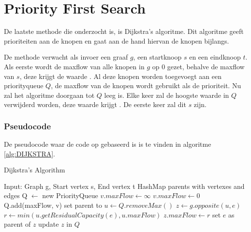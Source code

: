 \chapter{Priority First Search}
\label{chap:priorityfirst}

De laatste methode die onderzocht is, is Dijkstra's algoritme. Dit algoritme geeft prioriteiten aan de knopen en gaat aan de hand hiervan de knopen bijlangs.

De methode verwacht als invoer een graaf $g$, een startknoop $s$ en een eindknoop $t$.
Als eerste wordt de maxflow van alle knopen in $g$ op 0 gezet, behalve de maxflow van $s$, deze krijgt de waarde \infty. Al deze knopen worden toegevoegt aan een priorityqueue $Q$, de maxflow van de knopen wordt gebruikt als de prioriteit.
Nu zal het algoritme doorgaan tot $Q$ leeg is. Elke keer zal de hoogste waarde in $Q$ verwijderd worden, deze waarde krijgt . De eerste keer zal dit $s$ zijn.

\subsection{Pseudocode}
De pseudocode waar de code op gebaseerd is is te vinden in algoritme \ref{alg:DIJKSTRA}.

\begin{algorithm}[h]
\caption{Dijkstra's Algorithm}
\label{alg:DIJKSTRA}
\begin{algorithmic}
\REQUIRE Input: Graph g, Start vertex s, End vertex t
\STATE HashMap parents with vertexes and edges
\STATE Q $\gets$ new PriorityQueue
\STATE $v.maxFlow \gets \infty$
\ELSE
\STATE $v.maxFlow \gets 0$
\ENDIF
\STATE Q.add(maxFlow, v)
\STATE set parent to \emptyset
\ENDFOR
{}
\STATE $u \gets Q.removeMax()$
\STATE $z \gets g.opposite(u, e)$
\STATE $r \gets min(u.getResidualCapacity(e), u.maxFlow)$
\STATE $z.maxFlow \gets r$
\STATE set $e$ as parent of $z$
\STATE update $z$ in $Q$
\ENDIF
\ENDFOR
\ENDWHILE
\end{algorithmic}
\end{algorithm}